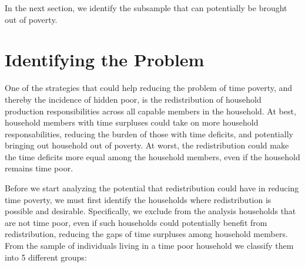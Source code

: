 \documentclass[
  11pt,
]{article}
\begin{document}
In the next section, we identify the subsample that can potentially be
brought out of poverty.

\section{Identifying the Problem}\label{sec-problem}

One of the strategies that could help reducing the problem of time
poverty, and thereby the incidence of hidden poor, is the redistribution
of household production responsibilities across all capable members in
the household. At best, household members with time surpluses could take
on more household responsabilities, reducing the burden of those with
time deficits, and potentially bringing out household out of poverty. At
worst, the redistribution could make the time deficits more equal among
the household members, even if the household remains time poor.

Before we start analyzing the potential that redistribution could have
in reducing time poverty, we must first identify the households where
redistribution is possible and desirable. Specifically, we exclude from
the analysis households that are not time poor, even if such households
could potentially benefit from redistribution, reducing the gaps of time
surpluses among household members. From the sample of individuals living
in a time poor household we classify them into 5 different groups:
\end{document}
